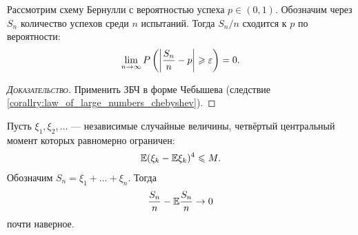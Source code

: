 \documentclass[../main.tex]{subfiles}
\begin{document}
\begin{crly}
 Рассмотрим схему Бернулли с вероятностью успеха $ p \in (0,1) $. Обозначим через $ S_n $ количество успехов среди $ n $ испытаний. Тогда $ S_n/n $ сходится к $ p $ по вероятности:
 \begin{align*}
  \lim_{n \to \infty} P \left( \left| \frac{S_n}{n} - p \right| \geqslant \varepsilon \right) = 0.
 \end{align*}
\end{crly}
\begin{proof}[\normalfont\textsc{Доказательство}]
 Применить ЗБЧ в форме Чебышева (следствие \ref{corallry:law_of_large_numbers_chebyshev}).
\end{proof}

\begin{thm}
 \label{theorem:strong_law_of_large_numbers}
 Пусть $ \xi_1,\xi_2, \ldots $ --- независимые случайные величины, четвёртый центральный момент которых равномерно ограничен:
 \begin{align*}
  \mathbb E (\xi_k-\mathbb E\xi_k)^{4} \leqslant M.
 \end{align*} Обозначим $ S_n = \xi_1 + \ldots + \xi_n $. Тогда
 \begin{align*}
  \frac{S_n}{n} - \mathbb E \frac{S_n}{n} \to 0
 \end{align*} почти наверное.
\end{thm}
\end{document}
